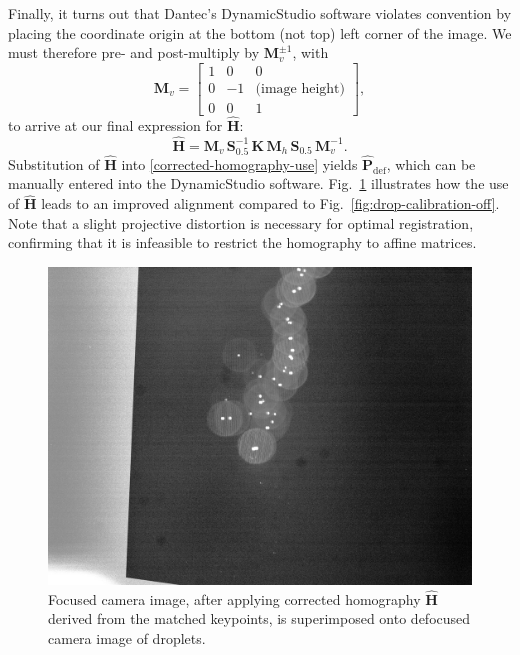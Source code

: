 \documentclass[11.5pt]{book}
\newcommand*{\figref}[1]{Fig.~\ref{#1}}
\begin{document}
Finally, it turns out that Dantec's DynamicStudio software violates convention
by placing the coordinate origin at the bottom (not top) left corner of the
image. We must therefore pre- and post-multiply by $\mathbf{M}_v^{\pm 1}$, with
\begin{equation*}
    \mathbf{M}_v = \left[ \begin{array}{ccc}
            1 & 0 & 0 \\
    0 & -1 & \text{(image height)} \\
            0 & 0 & 1
    \end{array} \right],
\end{equation*}
to arrive at our final expression for $\mathbf{\hat{H}}$:
\begin{equation}
    \mathbf{\hat{H}} = \mathbf{M}_v\, \mathbf{S}_{0.5}^{-1}\, \mathbf{K}\,
    \mathbf{M}_h\, \mathbf{S}_{0.5}\, \mathbf{M}_v^{-1}.
\end{equation}
Substitution of $\mathbf{\hat{H}}$ into \eqref{corrected-homography-use} yields
$\mathbf{\hat{P}}_\text{def}$, which can be manually entered into the
DynamicStudio software. \figref{fig:drop-calibration-corrected} illustrates
how the use of $\mathbf{\hat{H}}$ leads to an improved alignment compared to
\figref{fig:drop-calibration-off}. Note that a slight projective distortion
is necessary for optimal registration, confirming that it is infeasible to restrict the homography
to affine matrices.

\begin{figure}
    \centering
    \includegraphics[height=0.45\textheight]{img/orb/drop-calibration-corrected.jpg}
    \caption{Focused camera image, after applying corrected homography
        $\mathbf{\hat{H}}$ derived from the matched keypoints, is superimposed onto
    defocused camera image of droplets.}
    \label{fig:drop-calibration-corrected}
\end{figure}
\end{document}
